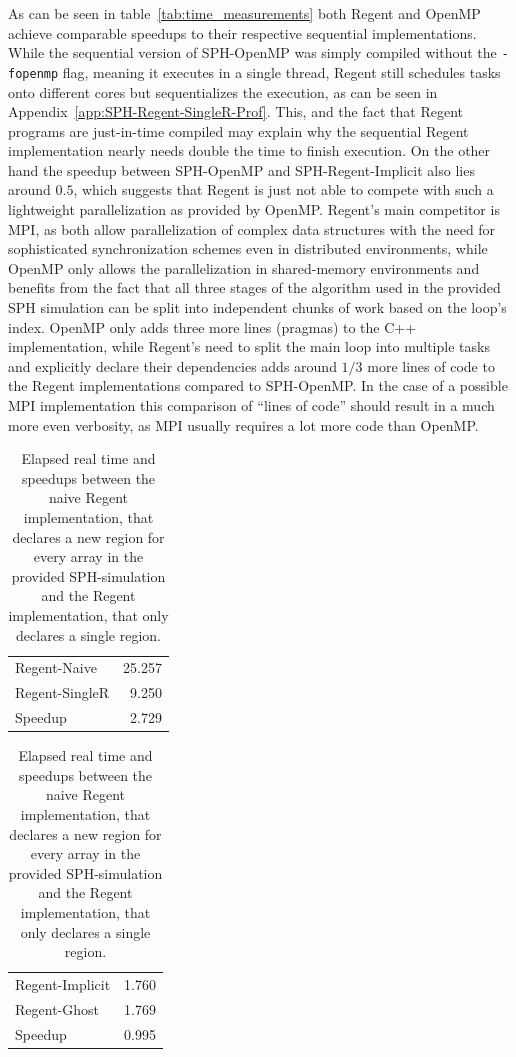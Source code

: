 \documentclass{article}      %
\begin{document}
As can be seen in table~\ref{tab:time_measurements} both Regent and OpenMP achieve comparable speedups to their respective sequential implementations. 
While the sequential version of SPH-OpenMP was simply compiled without the \lstinline{-fopenmp} flag, meaning it executes in a single thread, Regent still schedules tasks onto different cores but sequentializes the execution, as can be seen in Appendix~\ref{app:SPH-Regent-SingleR-Prof}.
This, and the fact that Regent programs are just-in-time compiled may explain why the sequential Regent 
implementation nearly needs double the time to finish execution.
On the other hand the speedup between SPH-OpenMP and SPH-Regent-Implicit also lies around $0.5$, which suggests that Regent is just not able to compete with such a lightweight parallelization as provided by OpenMP. 
Regent's main competitor is MPI, as both allow parallelization of complex data structures with the need for sophisticated synchronization schemes even in distributed environments, 
while OpenMP only allows the parallelization in shared-memory environments and benefits from the fact that all three stages of the algorithm used in the provided SPH simulation can be split into independent chunks of work based on the loop's index. 
OpenMP only adds three more lines (pragmas) to the C++ implementation, while Regent's need to split the main loop into multiple tasks and explicitly declare their dependencies adds around $1/3$ more lines of code to the Regent implementations compared to SPH-OpenMP. 
In the case of a possible MPI implementation this comparison of ``lines of code'' should result in a much more even verbosity, as MPI usually requires a lot more code than OpenMP.

\begin{table}[htb]
	\centering
	\begin{minipage}{0.45\textwidth}
		\centering
		\begin{tabular}{ l r }
			Regent-Naive  & 25.257 \\
			Regent-SingleR  & 9.250 \\ 
			\hline
			Speedup & 2.729 \\ 
		\end{tabular}
	\end{minipage}\hfill
	\begin{minipage}{0.45\textwidth}
		\centering
		\begin{tabular}{ l r }
			Regent-Implicit  & 1.760 \\
			Regent-Ghost  & 1.769 \\ 
			\hline
			Speedup & 0.995 \\ 
		\end{tabular}
	\end{minipage}

	\caption{Elapsed real time and speedups between the naive Regent implementation, that declares a new region for every array in the provided SPH-simulation and the Regent implementation, that only declares a single region.}\label{tab:time_measurements_naive}
\end{table}
\end{document}

